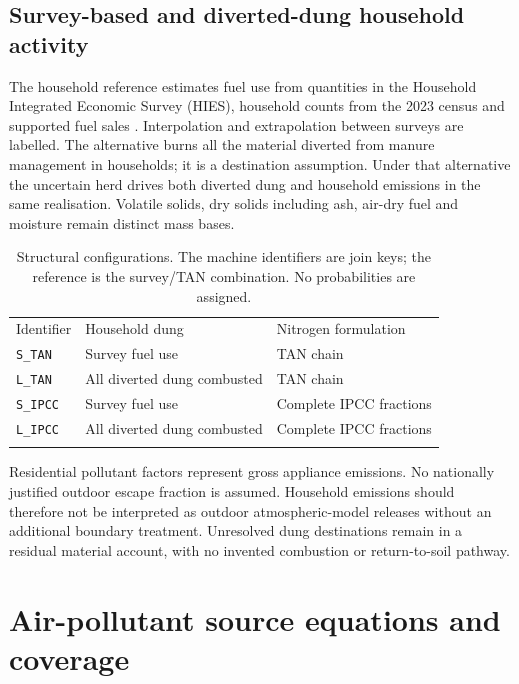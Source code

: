 \documentclass[essd]{copernicus}
\begin{document}
\subsection{Survey-based and diverted-dung household activity}
The household reference estimates fuel use from quantities in the Household Integrated Economic Survey (HIES), household counts from the 2023 census and supported fuel sales \citep{HIES2019,PBSHIES2026,PBSCensus2023}. Interpolation and extrapolation between surveys are labelled. The alternative burns all the material diverted from manure management in households; it is a destination assumption. Under that alternative the uncertain herd drives both diverted dung and household emissions in the same realisation. Volatile solids, dry solids including ash, air-dry fuel and moisture remain distinct mass bases.

\begin{table}[t]
\caption{Structural configurations. The machine identifiers are join keys; the reference is the survey/TAN combination. No probabilities are assigned.}
\label{tab:configurations}
\begin{tabularx}{\linewidth}{@{}lXX@{}}
\tophline
Identifier & Household dung & Nitrogen formulation \\
\middlehline
\texttt{S\_TAN} & Survey fuel use & TAN chain \\
\texttt{L\_TAN} & All diverted dung combusted & TAN chain \\
\texttt{S\_IPCC} & Survey fuel use & Complete IPCC fractions \\
\texttt{L\_IPCC} & All diverted dung combusted & Complete IPCC fractions \\
\bottomhline
\end{tabularx}
\end{table}

Residential pollutant factors represent gross appliance emissions. No nationally justified outdoor escape fraction is assumed. Household emissions should therefore not be interpreted as outdoor atmospheric-model releases without an additional boundary treatment. Unresolved dung destinations remain in a residual material account, with no invented combustion or return-to-soil pathway.

\section{Air-pollutant source equations and coverage}
\end{document}
